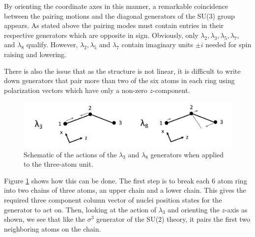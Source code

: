 \documentclass[prb,showpacs,superscriptaddress,titlepage,amsmath,amssymb,twocolumn]{revtex4-1}
\begin{document}
By orienting the coordinate axes in this manner, a remarkable coincidence between the pairing motions and the diagonal generators of the SU(3) group appears. As stated above the pairing modes must contain entries in their respective generators which are opposite in sign. Obviously, only $\lambda_{2}, \lambda_{3}, \lambda_{5}, \lambda_{7}$, and $\lambda_{8}$ qualify. However, $\lambda_{2},\lambda_{5}$ and $\lambda_{7}$ contain imaginary units $\pm i$ needed for spin raising and lowering. 

There is also the issue that as the structure is not linear, it is difficult to write down generators that pair more than two of the six atoms in each ring using polarization vectors which have only a non-zero $z$-component.

\begin{figure}
	\includegraphics[width=\columnwidth]{z-modes}
	\caption{Schematic of the actions of the $\lambda_{3}$ and $\lambda_{8}$ generators when applied to the three-atom unit.}
	\label{z-modes}
\end{figure}

Figure \ref{z-modes} shows how this can be done. The first step is to break each 6 atom ring into two chains of three atoms, an upper chain and a lower chain. This gives the required three component column vector of nuclei position states for the generator to act on. Then, looking at the action of $\lambda_{3}$ and orienting the $z$-axis as shown, we see that like the $\sigma^{3}$ generator of the SU(2) theory, it pairs the first two neighboring atoms on the chain.
\end{document}
